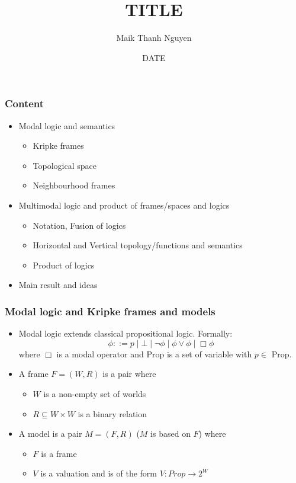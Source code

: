 \documentclass[hyperref={pdfpagelabels=false},t,10pt]{beamer}
\title{TITLE}
\author[© author]{Maik Thanh Nguyen}
\institute{Technische Universit\"at Dresden}
\date{DATE}
\begin{document}
\addtocounter{framenumber}{-1}
\maketitle

\begin{frame}
  \frametitle{Content}

  \begin{itemize}
  \item Modal logic and semantics
    \begin{itemize}
        \item Kripke frames
        \item Topological space
        \item Neighbourhood frames
     \end{itemize}
  \item Multimodal logic and product of frames/spaces and logics
    \begin{itemize}
      \item Notation, Fusion of logics
      \item Horizontal and Vertical topology/functions and semantics
      \item Product of logics
    \end{itemize}
  \item Main result and ideas
  \end{itemize}
\end{frame}

\begin{frame}
  \frametitle{Modal logic and Kripke frames and models}
  \begin{itemize}
    \item Modal logic extends classical propositional logic. Formally:
    $$\phi ::= p \mid \bot \mid \neg \phi \mid \phi \lor \phi \mid \Box \phi$$
    where $\Box$ is a modal operator and Prop is a set of variable with $p \in$ Prop.
     \pause

    \item A frame $F = (W,R)$ is a pair where 
    \begin{itemize}
      \item $W$ is a non-empty set of worlds
      \item $R \subseteq W \times W$ is a binary relation  
    \end{itemize}

    \item A model is a pair $M = (F,R)$ ($M$ is based on $F$) where
      \begin{itemize}
        \item $F$ is a frame
        \item $V$ is a valuation and is of the form $V : Prop \rightarrow 2^W$
      \end{itemize}
  \end{itemize}
\end{frame}
\end{document}
